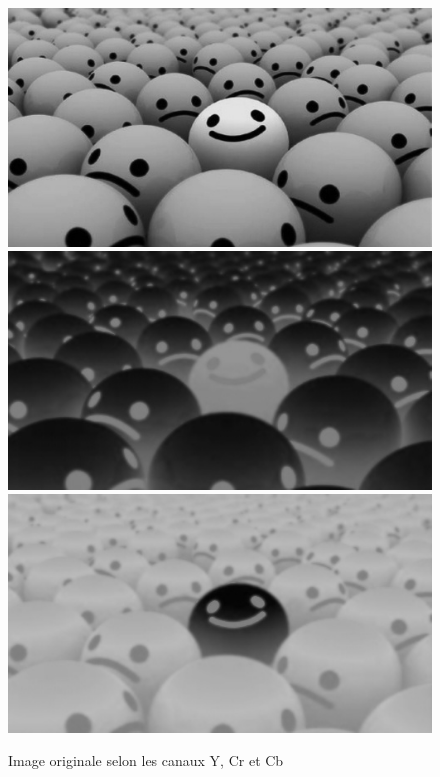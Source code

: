 \documentclass[12pt]{report}
\begin{document}
\begin{figure}[H]
\begin{center}
\includegraphics[scale=0.25]{../ImageRes/Image0_channel_0.jpg} 
\includegraphics[scale=0.25]{../ImageRes/Image0_channel_1.jpg} 
\includegraphics[scale=0.25]{../ImageRes/Image0_channel_2.jpg} 
\caption{Image originale selon les canaux Y, Cr et Cb}
\end{center}
\end{figure}
\end{document}
